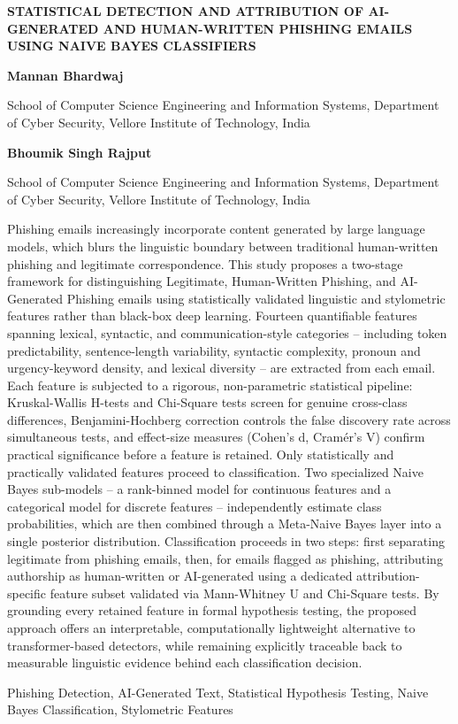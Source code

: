 \documentclass[11pt]{article}
\begin{document}
\begin{center}
{\bfseries\fontsize{11}{13}\selectfont STATISTICAL DETECTION AND ATTRIBUTION OF AI-GENERATED AND HUMAN-WRITTEN PHISHING EMAILS USING NAIVE BAYES CLASSIFIERS}

\vspace{0.5cm}

{\bfseries Mannan Bhardwaj}

School of Computer Science Engineering and Information Systems, Department of Cyber Security, Vellore Institute of Technology, India

\vspace{0.3cm}

{\bfseries Bhoumik Singh Rajput}

School of Computer Science Engineering and Information Systems, Department of Cyber Security, Vellore Institute of Technology, India

\end{center}

\vspace{0.5cm}


\vspace{0.2cm}

\noindent Phishing emails increasingly incorporate content generated by large language models, which blurs the linguistic boundary between traditional human-written phishing and legitimate correspondence. This study proposes a two-stage framework for distinguishing Legitimate, Human-Written Phishing, and AI-Generated Phishing emails using statistically validated linguistic and stylometric features rather than black-box deep learning. Fourteen quantifiable features spanning lexical, syntactic, and communication-style categories -- including token predictability, sentence-length variability, syntactic complexity, pronoun and urgency-keyword density, and lexical diversity -- are extracted from each email. Each feature is subjected to a rigorous, non-parametric statistical pipeline: Kruskal-Wallis H-tests and Chi-Square tests screen for genuine cross-class differences, Benjamini-Hochberg correction controls the false discovery rate across simultaneous tests, and effect-size measures (Cohen's d, Cram\'er's V) confirm practical significance before a feature is retained. Only statistically and practically validated features proceed to classification. Two specialized Naive Bayes sub-models -- a rank-binned model for continuous features and a categorical model for discrete features -- independently estimate class probabilities, which are then combined through a Meta-Naive Bayes layer into a single posterior distribution. Classification proceeds in two steps: first separating legitimate from phishing emails, then, for emails flagged as phishing, attributing authorship as human-written or AI-generated using a dedicated attribution-specific feature subset validated via Mann-Whitney U and Chi-Square tests. By grounding every retained feature in formal hypothesis testing, the proposed approach offers an interpretable, computationally lightweight alternative to transformer-based detectors, while remaining explicitly traceable back to measurable linguistic evidence behind each classification decision.

\vspace{0.3cm}

 Phishing Detection, AI-Generated Text, Statistical Hypothesis Testing, Naive Bayes Classification, Stylometric Features
\end{document}

